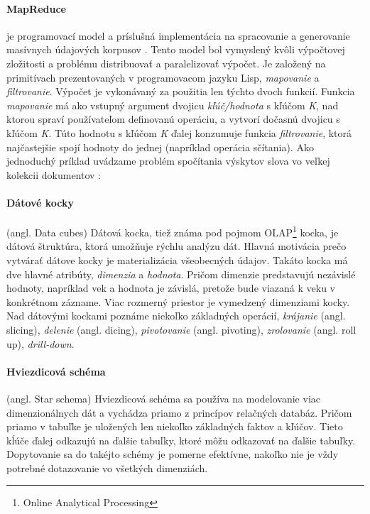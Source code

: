 \paragraph{MapReduce} je programovací model a príslušná implementácia na spracovanie a generovanie masívnych údajových korpusov \citep{Dean2008}. Tento model bol vymyslený kvôli výpočtovej zložitosti a problému distribuovať a paralelizovať výpočet. Je založený na primitívach prezentovaných v programovacom jazyku Lisp, \textit{mapovanie} a \textit{filtrovanie}. Výpočet je vykonávaný za použitia len týchto dvoch funkcií. Funkcia \textit{mapovanie} má ako vstupný argument dvojicu \textit{kľúč/hodnota} s kľúčom \textit{K}, nad ktorou spraví používateľom definovanú operáciu, a vytvorí dočasnú dvojicu s kľúčom \textit{K}. Túto hodnotu s kľúčom \textit{K} ďalej konzumuje funkcia \textit{filtrovanie}, ktorá najčastejšie spojí hodnoty do jednej (napríklad operácia sčítania). Ako jednoduchý príklad uvádzame problém spočítania výskytov slova vo veľkej kolekcii dokumentov \citep{Dean2008}:

\paragraph{Dátové kocky} (angl. Data cubes)
Dátová kocka, tiež známa pod pojmom OLAP\footnote{Online Analytical Processing} kocka, je dátová štruktúra, ktorá umožňuje rýchlu analýzu dát. Hlavná motivácia prečo vytvárať dátove kocky je materializácia všeobecných údajov. Takáto kocka má dve hlavné atribúty, \textit{dimenzia} a \textit{hodnota}. Pričom dimenzie predstavujú nezávislé hodnoty, napríklad vek a hodnota je závislá, pretože bude viazaná k veku v konkrétnom zázname. Viac rozmerný priestor je vymedzený dimenziami kocky. Nad dátovými kockami poznáme niekoľko základných operácií, \textit{krájanie} (angl. slicing), \textit{delenie} (angl. dicing), \textit{pivotovanie} (angl. pivoting), \textit{zrolovanie} (angl. roll up), \textit{drill-down}\citep{franekimporty}. 

\paragraph{Hviezdicová schéma} (angl. Star schema)
Hviezdicová schéma sa používa na modelovanie viac dimenzionálnych dát a vychádza priamo z princípov relačných databáz. Pričom priamo v tabuľke je uložených len niekoľko základných faktov a kľúčov. Tieto kĺúče ďalej odkazujú na ďalšie tabuľky, ktoré môžu odkazovať na ďalšie tabuľky\citep{chaudhuri1997overview}. Dopytovanie sa do takéjto schémy je pomerne efektívne, nakoľko nie je vždy potrebné dotazovanie vo všetkých dimenziách.

